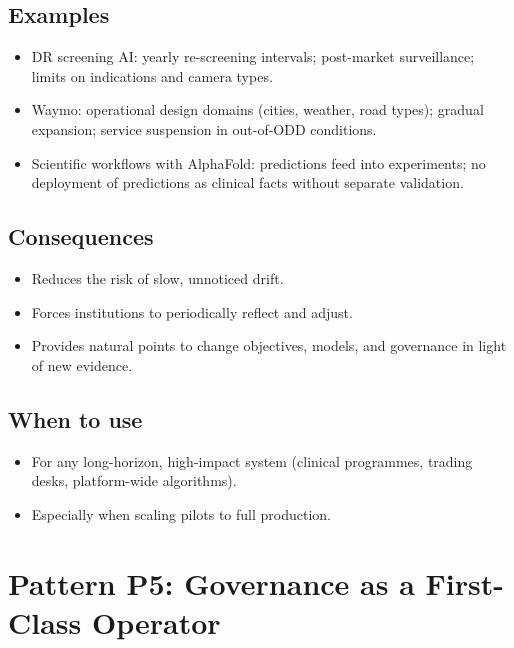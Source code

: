 \subsection*{Examples}

\begin{itemize}
  \item DR screening AI:
        yearly re-screening intervals; post-market surveillance; limits
        on indications and camera types.
  \item Waymo:
        operational design domains (cities, weather, road types);
        gradual expansion; service suspension in out-of-ODD conditions.
  \item Scientific workflows with AlphaFold:
        predictions feed into experiments; no deployment of predictions
        as clinical facts without separate validation.
\end{itemize}

\subsection*{Consequences}

\begin{itemize}
  \item Reduces the risk of slow, unnoticed drift.
  \item Forces institutions to periodically reflect and adjust.
  \item Provides natural points to change objectives, models, and
        governance in light of new evidence.
\end{itemize}

\subsection*{When to use}

\begin{itemize}
  \item For any long-horizon, high-impact system (clinical programmes,
        trading desks, platform-wide algorithms).
  \item Especially when scaling pilots to full production.
\end{itemize}

\section{Pattern P5: Governance as a First-Class Operator}
\label{pattern:p5}

